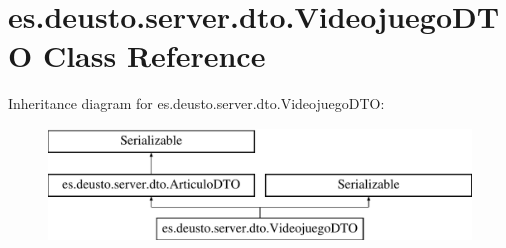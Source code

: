 \hypertarget{classes_1_1deusto_1_1server_1_1dto_1_1_videojuego_d_t_o}{}\section{es.\+deusto.\+server.\+dto.\+Videojuego\+D\+TO Class Reference}
\label{classes_1_1deusto_1_1server_1_1dto_1_1_videojuego_d_t_o}
Inheritance diagram for es.\+deusto.\+server.\+dto.\+Videojuego\+D\+TO\+:\begin{figure}[H]
\begin{center}
\leavevmode
\includegraphics[height=3.000000cm]{classes_1_1deusto_1_1server_1_1dto_1_1_videojuego_d_t_o}
\end{center}
\end{figure}
